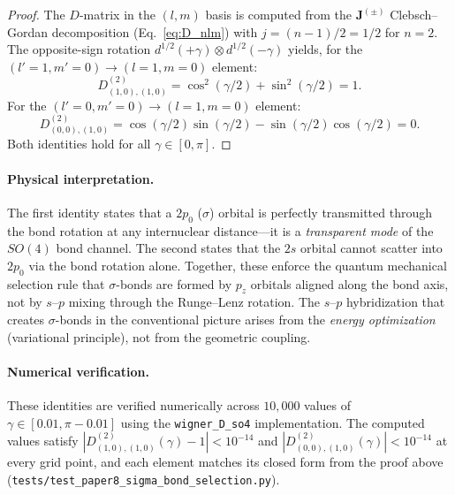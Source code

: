 \documentclass[aps,pra,twocolumn,superscriptaddress,longbibliography]{revtex4-2}
\theoremstyle{remark}
\theoremstyle{plain}
\begin{document}
\begin{proof}
The $D$-matrix in the $(l, m)$ basis is computed from the
$\mathbf{J}^{(\pm)}$ Clebsch--Gordan decomposition
(Eq.~\eqref{eq:D_nlm}) with $j = (n-1)/2 = 1/2$ for $n = 2$.
The opposite-sign rotation $d^{1/2}(+\gamma) \otimes d^{1/2}(-\gamma)$
yields, for the $(l' = 1, m' = 0) \to (l = 1, m = 0)$ element:
\begin{equation}
D^{(2)}_{(1,0),(1,0)} = \cos^2(\gamma/2) + \sin^2(\gamma/2) = 1.
\end{equation}
For the $(l' = 0, m' = 0) \to (l = 1, m = 0)$ element:
\begin{equation}
D^{(2)}_{(0,0),(1,0)} = \cos(\gamma/2)\sin(\gamma/2)
                       - \sin(\gamma/2)\cos(\gamma/2) = 0.
\end{equation}
Both identities hold for all $\gamma \in [0, \pi]$.
\end{proof}

\paragraph{Physical interpretation.}
The first identity states that a $2p_0$ ($\sigma$) orbital is perfectly
transmitted through the bond rotation at any internuclear distance---it is
a \emph{transparent mode} of the $SO(4)$ bond channel.  The second states
that the $2s$ orbital cannot scatter into $2p_0$ via the bond rotation
alone.  Together, these enforce the quantum mechanical selection rule that
$\sigma$-bonds are formed by $p_z$ orbitals aligned along the bond axis,
not by $s$--$p$ mixing through the Runge--Lenz rotation.  The $s$--$p$
hybridization that creates $\sigma$-bonds in the conventional picture
arises from the \emph{energy optimization} (variational principle), not
from the geometric coupling.

\paragraph{Numerical verification.}
These identities are verified numerically across $10{,}000$ values of
$\gamma \in [0.01, \pi - 0.01]$ using the \texttt{wigner\_D\_so4}
implementation.  The computed values satisfy
$|D^{(2)}_{(1,0),(1,0)}(\gamma) - 1| < 10^{-14}$ and
$|D^{(2)}_{(0,0),(1,0)}(\gamma)| < 10^{-14}$ at every grid point, and
each element matches its closed form from the proof above
(\texttt{tests/test\_paper8\_sigma\_bond\_selection.py}).


\end{document}

